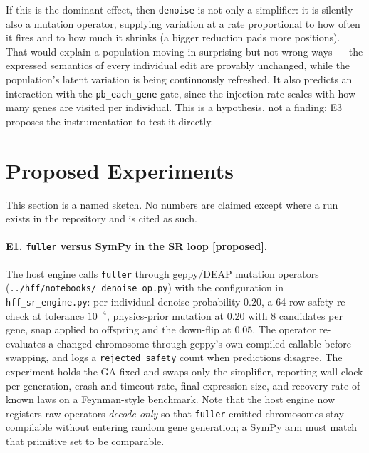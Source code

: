 \documentclass[sigconf]{acmart}
\begin{document}
If this is the dominant effect, then \texttt{denoise} is not only a simplifier: it
is silently also a mutation operator, supplying variation at a rate proportional
to how often it fires and to how much it shrinks (a bigger reduction pads more
positions). That would explain a population moving in surprising-but-not-wrong
ways --- the expressed semantics of every individual edit are provably unchanged,
while the population's latent variation is being continuously refreshed. It also
predicts an interaction with the \texttt{pb\_each\_gene} gate, since the injection
rate scales with how many genes are visited per individual. This is a hypothesis,
not a finding; E3 proposes the instrumentation to test it directly.

\section{Proposed Experiments}
\label{sec:experiments}

This section is a named sketch. No numbers are claimed except where a run exists
in the repository and is cited as such.

\paragraph{E1. \texttt{fuller} versus SymPy in the SR loop [proposed].} The host
engine calls \texttt{fuller} through geppy/DEAP mutation operators
(\texttt{../hff/notebooks/\_denoise\_op.py}) with the configuration in
\texttt{hff\_sr\_engine.py}: per-individual denoise probability $0.20$, a
64-row safety re-check at tolerance $10^{-4}$, physics-prior mutation at $0.20$
with 8 candidates per gene, snap applied to offspring and the down-flip at
$0.05$. The operator re-evaluates a changed chromosome through geppy's own
compiled callable before swapping, and logs a \texttt{rejected\_safety} count
when predictions disagree. The experiment holds the GA fixed and swaps only the
simplifier, reporting wall-clock per generation, crash and timeout rate, final
expression size, and recovery rate of known laws on a Feynman-style benchmark.
Note that the host engine now registers raw operators \emph{decode-only} so that
\texttt{fuller}-emitted chromosomes stay compilable without entering random gene
generation; a SymPy arm must match that primitive set to be comparable.
\end{document}
